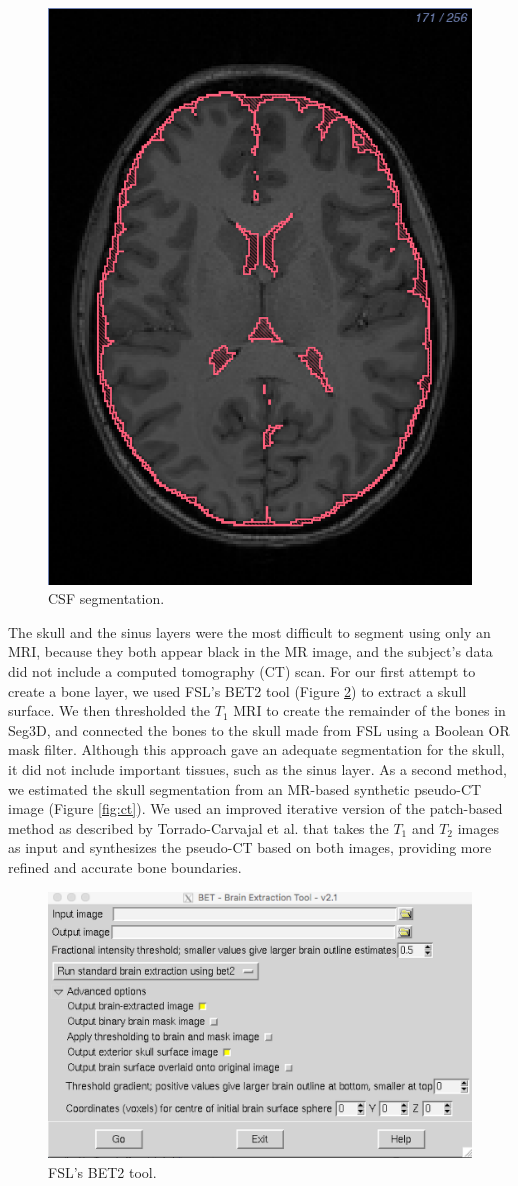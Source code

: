 \begin{figure}[H]
\begin{center}
\includegraphics[width=.49\textwidth]{Figures/CSF_seg}
\caption{CSF segmentation.}
\label{fig:csf}
\end{center}
\end{figure}

The skull and the sinus layers were the most difficult to segment using only an MRI, because they both appear black in the MR image, and the subject's data did not include a computed tomography (CT) scan. For our first attempt to create a bone layer, we used FSL's BET2 tool (Figure \ref{fig:bet2}) to extract a skull surface. We then thresholded the $T_1$ MRI to create the remainder of the bones in Seg3D, and connected the bones to the skull made from FSL using a Boolean OR mask filter. Although this approach gave an adequate segmentation for the skull, it did not include important tissues, such as the sinus layer. As a second method, we estimated the skull segmentation from an MR-based synthetic pseudo-CT image (Figure \ref{fig:ct}). We used an improved iterative version of the patch-based method as described by Torrado-Carvajal et al. \cite{ref:pseudoct} that takes the $T_1$ and $T_2$ images as input and synthesizes the pseudo-CT based on both images, providing more refined and accurate bone boundaries.

\begin{figure}[H]
\begin{center}
\includegraphics[width=.75\textwidth]{Figures/BET2}
\caption{FSL's BET2 tool.}
\label{fig:bet2}
\end{center}
\end{figure}

